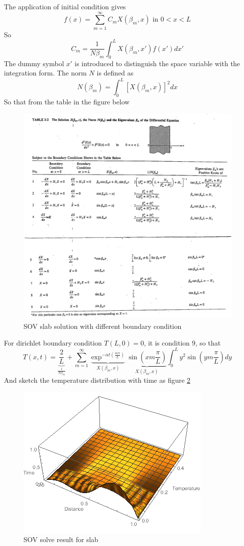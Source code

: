 \begin{solution}
The application of initial condition gives
$$f(x)=\sum_{m=1}^{\infty} C_m X(\beta_m,x) \text{ in } 0<x<L$$
So 
$$C_m=\frac{1}{N\beta_m}\int_0^L X(\beta_m,x')f(x')dx'$$
The dummy symbol $x'$ is introduced to distinguish the space variable with the integration form. The norm $N$ is defined as
$$N(\beta_m)=\int_0^L [X(\beta_m,x)]^2dx$$
So that from the table in the figure below
\begin{figure}[H]
  \centering
    \includegraphics[scale=0.6]{figures/ch4/7}
    \caption{SOV slab solution with different boundary condition}
    \label{fig:4:7}
\end{figure}

For dirichlet boundary condition $T(L,0)=0$, it is condition 9, so that
\[
 T(x,t) = 
   \underbrace{\frac{2}{L}}_{\frac{1}{N\beta_m}} +\sum_{m=1}^{\infty}
   \underbrace{\exp^{-\alpha t \left(\frac{m\pi}{L}\right)}}_{X(\beta_m,x)}
   \underbrace{\sin\left(xm\frac{\pi}{L}\right)}_{X(\beta_m,x)}
   \int_0^L{y^2 \sin\left(ym\frac{\pi}{L}\right)}dy
\]
And sketch the temperature distribution with time as figure \ref{fig:4:8}
\begin{figure}[H]
  \centering
    \includegraphics[scale=1]{figures/ch4/8}
    \caption{SOV solve result for slab}
    \label{fig:4:8}
\end{figure}
\end{solution}


